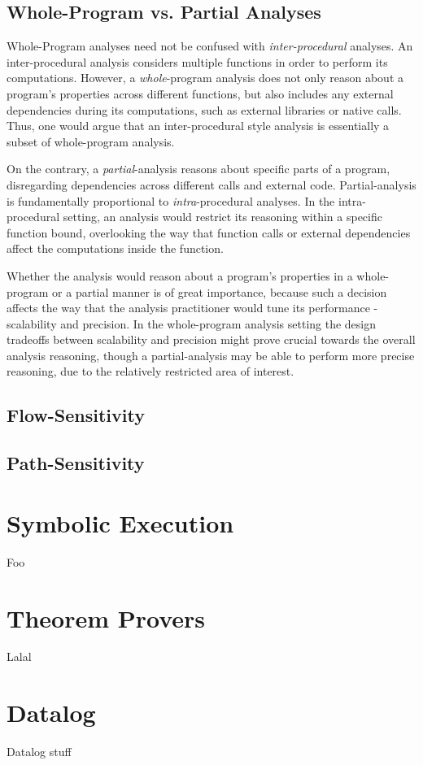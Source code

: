 \subsection{Whole-Program vs. Partial Analyses}

Whole-Program analyses need not be confused with \emph{inter-procedural} analyses. 
An inter-procedural analysis considers multiple functions in order to perform
its computations. However, a \emph{whole}-program analysis does not only reason
about a program's properties across different functions, but also includes any 
external dependencies during its computations, such as external libraries or 
native calls. Thus, one would argue that an inter-procedural style analysis is 
essentially a subset of whole-program analysis.

On the contrary, a \emph{partial}-analysis reasons about specific parts of a
program, disregarding dependencies across different calls and external code.
Partial-analysis is fundamentally proportional to \emph{intra}-procedural analyses.
In the intra-procedural setting, an analysis would restrict its reasoning within
a specific function bound, overlooking the way that function calls or external
dependencies affect the computations inside the function.

Whether the analysis would reason about a program's properties in a whole-program
or a partial manner is of great importance, because such a decision affects the
way that the analysis practitioner would tune its performance - scalability and
precision. In the whole-program analysis setting the design tradeoffs between
scalability and precision might prove crucial towards the overall analysis
reasoning, though a partial-analysis may be able to perform more precise reasoning,
due to the relatively restricted area of interest. 

\subsection{Flow-Sensitivity}

\subsection{Path-Sensitivity}


\section{Symbolic Execution}
Foo

\section{Theorem Provers}
Lalal

\section{Datalog}
Datalog stuff
